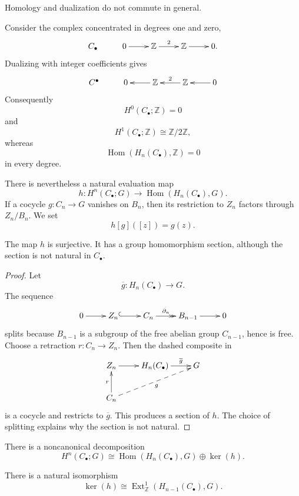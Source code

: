 \noindent
Homology and dualization do not commute in
general.

\begin{example}
\label{at-example-uct-two-complex}
Consider the complex concentrated in
degrees one and zero,
$$
\xymatrix{
C_\bullet
  & 0 \ar[r]
  & \mathbb{Z} \ar[r]^-2
  & \mathbb{Z} \ar[r]
  & 0.
}
$$
Dualizing with integer coefficients gives
$$
\xymatrix{
C^\bullet
  & 0
  & \mathbb{Z} \ar[l]
  & \mathbb{Z} \ar[l]_-2
  & 0 \ar[l].
}
$$
Consequently
$$
H^0(C_\bullet;\mathbb{Z})=0
$$
and
$$
H^1(C_\bullet;\mathbb{Z})
\cong\mathbb{Z}/2\mathbb{Z},
$$
whereas
$$
\operatorname{Hom}
(H_n(C_\bullet),\mathbb{Z})=0
$$
in every degree.
\end{example}

\noindent
There is nevertheless a natural evaluation
map
$$
h:H^n(C_\bullet;G)
\longrightarrow
\operatorname{Hom}(H_n(C_\bullet),G).
$$
If a cocycle $g:C_n\to G$ vanishes on
$B_n$, then its restriction to $Z_n$
factors through $Z_n/B_n$.  We set
$$
h[g]([z])=g(z).
$$

\begin{proposition}
\label{at-proposition-uct-map-surjective}
The map $h$ is surjective.  It has a group
homomorphism section, although the section
is not natural in $C_\bullet$.
\end{proposition}

\begin{proof}
Let
$$
\overline g:H_n(C_\bullet)\longrightarrow G.
$$
The sequence
$$
\xymatrix{
0 \ar[r]
  & Z_n \ar@{^{(}->}[r]
  & C_n \ar@{->>}[r]^-{\partial_n}
  & B_{n-1} \ar[r]
  & 0
}
$$
splits because $B_{n-1}$ is a subgroup of
the free abelian group $C_{n-1}$, hence is
free.  Choose a retraction $r:C_n\to Z_n$.
Then the dashed composite in
$$
\xymatrix{
Z_n \ar[r]
  & H_n(C_\bullet)
    \ar[r]^-{\overline g}
  & G \\
C_n \ar[u]^r
  \ar@{-->}[urr]_-g
}
$$
is a cocycle and restricts to
$\overline g$.  This produces a section of
$h$.  The choice of splitting explains why
the section is not natural.
\end{proof}

\begin{corollary}
\label{at-lemma-uct-split-form}
There is a noncanonical decomposition
$$
H^n(C_\bullet;G)
\cong
\operatorname{Hom}(H_n(C_\bullet),G)
\oplus\ker(h).
$$
\end{corollary}

\begin{proposition}
\label{at-proposition-uct-kernel}
There is a natural isomorphism
$$
\ker(h)
\cong
\operatorname{Ext}^1_{\mathbb{Z}}
(H_{n-1}(C_\bullet),G).
$$
\end{proposition}

